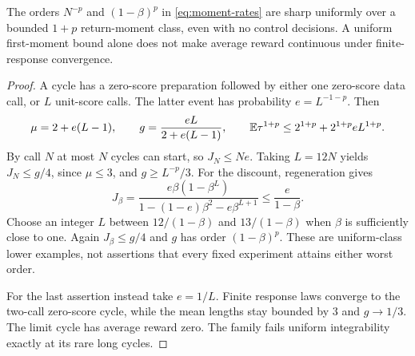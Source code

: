 \begin{proposition}\label{prop:time-sharp}
The orders $N^{-p}$ and $(1-\beta)^p$ in \eqref{eq:moment-rates} are sharp uniformly over a bounded $1+p$ return-moment class, even with no control decisions. A uniform first-moment bound alone does not make average reward continuous under finite-response convergence.
\end{proposition}
\begin{proof}
A cycle has a zero-score preparation followed by either one zero-score data call, or $L$ unit-score calls. The latter event has probability $e=L^{-1-p}$. Then
\[
 \mu=2+e(L-1),\qquad g=\frac{eL}{2+e(L-1)},\qquad
 \mathbb E\tau^{1+p}\le 2^{1+p}+2^{1+p}eL^{1+p}.
\]
By call $N$ at most $N$ cycles can start, so $J_N\le Ne$. Taking $L=12N$ yields $J_N\le g/4$, since $\mu\le3$, and $g\ge L^{-p}/3$. For the discount, regeneration gives
\[
 J_\beta=\frac{e\beta(1-\beta^L)}
 {1-(1-e)\beta^2-e\beta^{L+1}}
 \le\frac{e}{1-\beta}.
\]
Choose an integer $L$ between $12/(1-\beta)$ and $13/(1-\beta)$ when $\beta$ is sufficiently close to one. Again $J_\beta\le g/4$ and $g$ has order $(1-\beta)^p$. These are uniform-class lower examples, not assertions that every fixed experiment attains either worst order.

For the last assertion instead take $e=1/L$. Finite response laws converge to the two-call zero-score cycle, while the mean lengths stay bounded by $3$ and $g\to1/3$. The limit cycle has average reward zero. The family fails uniform integrability exactly at its rare long cycles.
\end{proof}
